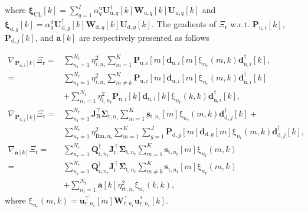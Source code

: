 \documentclass[9pt,journal]{IEEEtran}
\newcommand{\paren}[1]{\left({#1}\right)}
\newcommand{\bracket}[1]{{\left [{#1}\right ]}}
\newcommand{\rr}{_\mathrm{r}}
\newcommand{\rnr}{_{\mathrm{r},n_\mathrm{r}}}
\newcommand{\target}{\mathrm{t}}
\newcommand{\sigmanr}{\boldsymbol{\Sigma}_{\textrm{t},n\rr}}
\newcommand{\PiB}{\mathbf{P}_{\textrm{u},i}\bracket{k}}
\newcommand{\PBj}{\mathbf{P}_{\textrm{d},j}\bracket{k}}
\newcommand{\UqB}{\mathbf{U}_{\textrm{u},q}\bracket{k}}
\newcommand{\UqBnH}{\mathbf{U}^\dagger_{\textrm{u},q}\bracket{k}}
\newcommand{\WqB}{\mathbf{W}_{\textrm{u},q}\bracket{k}}
\theoremstyle{definition}
\begin{document}
where $\boldsymbol{\xi}_{\textrm{UL}}\bracket{k}$$=\sum_{q=1}^{\mathit{I}}\alpha^\textrm{u}_q\UqBnH\WqB\UqB$ and  $\boldsymbol{\xi}_{\textrm{d},g}\bracket{k}=\alpha^\textrm{d}_g\mathbf{U}^\dagger_{\textrm{d},g}\bracket{k}\mathbf{W}_{\textrm{d},g}\bracket{k}\mathbf{U}_{\textrm{d},g}\bracket{k}$.
The gradients of $\Xi_{\text{r}}$ w.r.t. $\PiB$, $\PBj$, and $\mathbf{a}\bracket{k}$ are respectively presented as follows  \par\noindent\small
\begin{align}
\nabla_{\PiB}\Xi_{\text{r}}=&\sum_{n\rr=1}^{\mathit{N}\rr}\eta^2_{i,n\rr}\sum_{m=1}^{\mathrm{\mathit{K}}}\mathbf{P}_{\textrm{u},i}\bracket{m}\mathbf{d}_{\textrm{u},i}\bracket{m}\mathrm{\xi}_{n\rr}\paren{m,k}\mathbf{d}^\dagger_{\textrm{u},i}\bracket{k},\nonumber\\
=&\sum_{n\rr=1}^{\mathit{N}\rr}\eta^2_{i,n\rr}\sum_{m\neq k}^{\mathrm{\mathit{K}}}\mathbf{P}_{\textrm{u},i}\bracket{m}\mathbf{d}_{\textrm{u},i}\bracket{m}\mathrm{\xi}_{n\rr}\paren{m,k}\mathbf{d}^\dagger_{\textrm{u},i}\bracket{k}\nonumber\\
&+\sum_{n\rr=1}^{\mathit{N}\rr}\eta^2_{i,n\rr}\mathbf{P}_{\textrm{u},i}\bracket{k}\mathbf{d}_{\textrm{u},i}\bracket{k}\mathrm{\xi}_{n\rr}\paren{k,k}\mathbf{d}^\dagger_{\textrm{u},i}\bracket{k}\nonumber,\\
\nabla_{\PBj}\Xi_{\text{r}}
=&\sum_{n\rr=1}^{\mathit{N}\rr}\mathbf{J}^\top_{\textrm{B}}\sigmanr\sum_{m=1}^{\mathrm{\mathit{K}}}\mathbf{s}_{\target,n\rr}\bracket{m}\mathrm{\xi}_{n\rr}\paren{m,k}\mathbf{d}^\dagger_{\textrm{d},j}\bracket{k}+\nonumber\\
&\sum_{n\rr=1}^{\mathit{N}\rr}\eta^2_{\textrm{Bm},n\rr}\sum_{m=1}^{\mathrm{\mathit{K}}}\sum_{g=1}^{\mathit{J}}\mathbf{P}_{\textrm{d},g}\bracket{m}\mathbf{d}_{\textrm{d},g}\bracket{m}\mathrm{\xi}_{n\rr}\paren{m,k}\mathbf{d}^\dagger_{\textrm{d},j}\bracket{k},\nonumber\\
\nabla_{\mathbf{a}\bracket{k}}\Xi_{\text{r}}=& \sum_{n\rr=1}^{\mathit{N}\rr}\mathbf{Q}^\dagger\rnr\mathbf{J}^\top_{\textrm{r}}\sigmanr\sum_{m=1}^{\mathrm{\mathit{K}}}\mathbf{s}_{\target,n\rr}\bracket{m}\mathrm{\xi}_{n\rr}\paren{m,k}\nonumber\\
=&\sum_{n\rr=1}^{\mathit{N}\rr}\mathbf{Q}^\dagger\rnr\mathbf{J}^\top_{\textrm{r}}\sigmanr\sum_{m\neq k}^{\mathrm{\mathit{K}}}\mathbf{s}_{\target,n\rr}\bracket{m}\mathrm{\xi}_{n\rr}\paren{m,k}\nonumber\\
&+\sum_{n\rr=1}^{\mathit{N}\rr}\mathbf{a}\bracket{k}\eta^2_{\textrm{rt},n\rr}\mathrm{\xi}_{n\rr}\paren{k,k},\nonumber
\end{align}\normalsize
where  $\mathrm{\xi}_{n\rr}\paren{m,k}$$=\mathbf{u}^\top_{\textrm{r},n\rr}\bracket{m}\mathbf{W}^\top\rnr\mathbf{u}^\ast_{\textrm{r},n\rr}\bracket{k}$.
\end{document}
